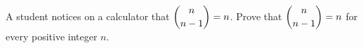 A student notices on a calculator that $\dbinom{n}{n-1}=n$. Prove that $\dbinom{n}{n-1}=n$ for every positive integer $n$.
